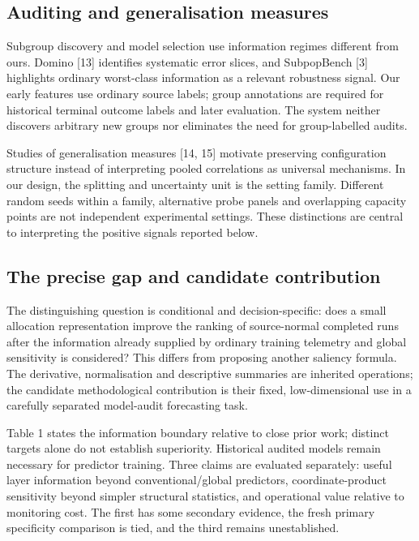 \subsection{Auditing and generalisation measures}
Subgroup discovery and model selection use information regimes different from ours. Domino [13] identifies systematic error slices, and SubpopBench [3] highlights ordinary worst-class information as a relevant robustness signal. Our early features use ordinary source labels; group annotations are required for historical terminal outcome labels and later evaluation. The system neither discovers arbitrary new groups nor eliminates the need for group-labelled audits.

Studies of generalisation measures [14, 15] motivate preserving configuration structure instead of interpreting pooled correlations as universal mechanisms. In our design, the splitting and uncertainty unit is the setting family. Different random seeds within a family, alternative probe panels and overlapping capacity points are not independent experimental settings. These distinctions are central to interpreting the positive signals reported below.


\subsection{The precise gap and candidate contribution}
The distinguishing question is conditional and decision-specific: does a small allocation representation improve the ranking of source-normal completed runs after the information already supplied by ordinary training telemetry and global sensitivity is considered? This differs from proposing another saliency formula. The derivative, normalisation and descriptive summaries are inherited operations; the candidate methodological contribution is their fixed, low-dimensional use in a carefully separated model-audit forecasting task.

Table 1 states the information boundary relative to close prior work; distinct targets alone do not establish superiority. Historical audited models remain necessary for predictor training. Three claims are evaluated separately: useful layer information beyond conventional/global predictors, coordinate-product sensitivity beyond simpler structural statistics, and operational value relative to monitoring cost. The first has some secondary evidence, the fresh primary specificity comparison is tied, and the third remains unestablished.

